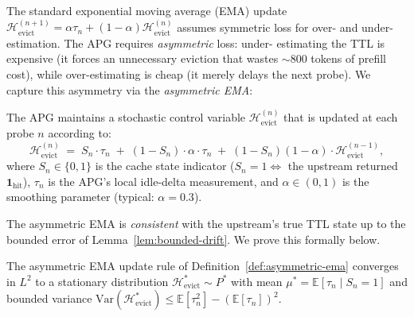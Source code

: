 The standard exponential moving average (EMA) update
$\mathcal{H}_{\text{evict}}^{(n+1)} = \alpha \tau_n + (1 - \alpha)
\mathcal{H}_{\text{evict}}^{(n)}$ assumes symmetric loss for over- and
under-estimation. The APG requires \emph{asymmetric} loss: under-
estimating the TTL is expensive (it forces an unnecessary eviction
that wastes $\sim 800$ tokens of prefill cost), while over-estimating
is cheap (it merely delays the next probe). We capture this asymmetry
via the \emph{asymmetric EMA}:

\begin{definition}
\label{def:asymmetric-ema}
The APG maintains a stochastic control variable $\mathcal{H}_{\text{evict}}^{(n)}$
that is updated at each probe $n$ according to:
\begin{equation}
\mathcal{H}_{\text{evict}}^{(n)}
\;=\;
S_n \cdot \tau_n
\;+\;
(1 - S_n) \cdot \alpha \cdot \tau_n
\;+\;
(1 - S_n)(1 - \alpha) \cdot \mathcal{H}_{\text{evict}}^{(n-1)},
\label{eq:asymmetric-ema}
\end{equation}
where $S_n \in \{0, 1\}$ is the cache state indicator
($S_n = 1 \Leftrightarrow$ the upstream returned
$\mathbf{1}_{\text{hit}}$), $\tau_n$ is the APG's local idle-delta
measurement, and $\alpha \in (0, 1)$ is the smoothing parameter
(typical: $\alpha = 0.3$).
\end{definition}

The asymmetric EMA is \emph{consistent} with the upstream's true TTL
state up to the bounded error of Lemma~\ref{lem:bounded-drift}. We
prove this formally below.

\begin{theorem}
\label{thm:asymmetric-ema-convergence}
The asymmetric EMA update rule of
Definition~\ref{def:asymmetric-ema} converges in $L^2$ to a stationary
distribution $\mathcal{H}_{\text{evict}}^{*} \sim P^{*}$ with mean
$\mu^{*} = \mathbb{E}[\tau_n \mid S_n = 1]$ and bounded variance
$\mathrm{Var}(\mathcal{H}_{\text{evict}}^{*}) \le
\mathbb{E}[\tau_n^{2}] - (\mathbb{E}[\tau_n])^{2}$.
\end{theorem}

